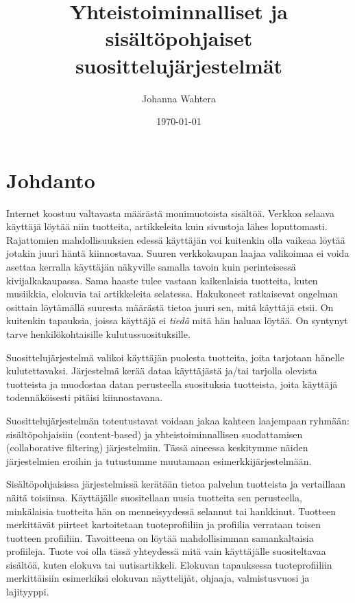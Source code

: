 \documentclass[12pt,finnish]{tktltiki2}
\title{Yhteistoiminnalliset ja sisältöpohjaiset suosittelujärjestelmät}
\author{Johanna Wahtera}
\date{\today}
\theoremstyle{definition}
\theoremstyle{remark}
\begin{document}

\frontmatter      %

\maketitle        %
\makeabstract     %

\tableofcontents  %


\mainmatter       %


\section{Johdanto}
         Internet koostuu valtavasta määrästä monimuotoista sisältöä. Verkkoa selaava käyttäjä löytää niin tuotteita, artikkeleita kuin sivustoja lähes loputtomasti. Rajattomien mahdollisuuksien edessä käyttäjän voi kuitenkin olla vaikeaa löytää jotakin juuri häntä kiinnostavaa. Suuren verkkokaupan laajaa valikoimaa ei voida asettaa kerralla käyttäjän näkyville samalla tavoin kuin perinteisessä kivijalkakaupassa. Sama haaste tulee vastaan kaikenlaisia tuotteita, kuten musiikkia, elokuvia tai artikkeleita selatessa. Hakukoneet ratkaisevat ongelman osittain löytämällä suuresta määrästä tietoa juuri sen, mitä käyttäjä etsii. On kuitenkin tapauksia, joissa käyttäjä ei \textit{tiedä} mitä hän haluaa löytää. On syntynyt tarve henkilökohtaisille kulutussuosituksille.
        
Suosittelujärjestelmä valikoi käyttäjän puolesta tuotteita, joita tarjotaan hänelle kulutettavaksi. Järjestelmä kerää dataa käyttäjästä ja/tai tarjolla olevista tuotteista ja muodostaa datan perusteella suosituksia tuotteista, joita käyttäjä todennäköisesti pitäisi kiinnostavana.

Suosittelujärjestelmän toteutustavat voidaan jakaa kahteen laajempaan ryhmään: sisältöpohjaisiin (content-based) ja yhteistoiminnallisen suodattamisen (collaborative filtering) järjestelmiin. Tässä aineessa keskitymme näiden järjestelmien eroihin ja tutustumme muutamaan esimerkkijärjestelmään.

        Sisältöpohjaisissa järjestelmissä kerätään tietoa palvelun tuotteista ja vertaillaan näitä toisiinsa. Käyttäjälle suositellaan uusia tuotteita sen perusteella, minkälaisia tuotteita hän on menneisyydessä selannut tai hankkinut. Tuotteen merkittävät piirteet kartoitetaan tuoteprofiiliin ja profiilia verrataan toisen tuotteen profiiliin. Tavoitteena on löytää mahdollisimman samankaltaisia profiileja. Tuote voi olla tässä yhteydessä mitä vain käyttäjälle suositeltavaa sisältöä, kuten elokuva tai uutisartikkeli. Elokuvan tapauksessa tuoteprofiiliin merkittäisiin esimerkiksi elokuvan näyttelijät, ohjaaja, valmistusvuosi ja lajityyppi. 
        
\end{document}
